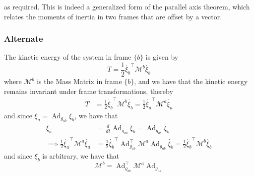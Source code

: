 as required.
This is indeed a generalized form of the parallel axis theorem, which relates the moments of inertia in two frames that are offset by a vector.

\subsubsection*{Alternate}

The kinetic energy of the system in frame \( \{b\} \) is given by
\begin{equation*}
    T
    =
    \frac{1}{2} \dot{\xi_{b}}^{\top} \mathcal{M}^{b} \dot{\xi_{b}}
\end{equation*}
where \( \mathcal{M}^{b} \) is the Mass Matrix in frame \( \{b\} \), and we have that the kinetic energy remains invariant under frame transformations, thereby
\begin{align*}
    T
     & =
    \frac{1}{2} \dot{\xi_{b}}^{\top} \mathcal{M}^{b} \dot{\xi_{b}}
    =
    \frac{1}{2} \dot{\xi_{a}}^{\top} \mathcal{M}^{a} \dot{\xi_{a}}
\end{align*}
and since \( \xi_{a} = \operatorname{Ad}_{g_{a b}} \xi_{b} \), we have that
\begin{align*}
    \dot{\xi_{a}}
     & =
    \frac{d}{dt} \operatorname{Ad}_{g_{a b}} \xi_{b}
    =
    \operatorname{Ad}_{g_{a b}} \dot{\xi_{b}}
    \\
    \implies
    \frac{1}{2} \dot{\xi_{a}}^{\top} \mathcal{M}^{a} \dot{\xi_{a}}
     & =
    \frac{1}{2} \dot{\xi_{b}}^{\top} \operatorname{Ad}_{g_{a b}}^{\top} \mathcal{M}^{a} \operatorname{Ad}_{g_{a b}} \dot{\xi_{b}}
    =
    \frac{1}{2} \dot{\xi_{b}}^{\top} \mathcal{M}^{b} \dot{\xi_{b}}
\end{align*}
and since \( \xi_{b} \) is arbitrary, we have that
\begin{equation*}
    \boxed{
    \mathcal{M}^{b}
    =
    \operatorname{Ad}_{g_{a b}}^{\top} \mathcal{M}^{a} \operatorname{Ad}_{g_{a b}}
    }
\end{equation*}
